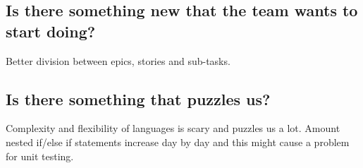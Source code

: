 \subsection*{Is there something new that the team wants to start doing?}
Better division between epics, stories and sub-tasks. 


\subsection*{Is there something that puzzles us?}
Complexity and flexibility of languages is scary and puzzles us a lot.
Amount nested if/else if statements increase day by day and this might cause a problem for unit testing.

\newpage
